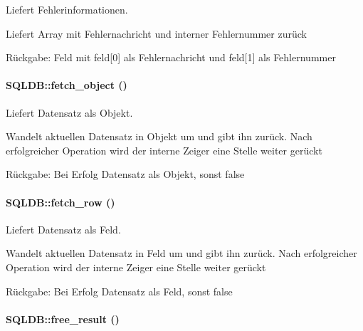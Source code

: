 Liefert Fehlerinformationen. 

Liefert Array mit Fehlernachricht und interner Fehlernummer zurück \begin{Desc}
\item[R\"{u}ckgabe:]Feld mit feld\mbox{[}0\mbox{]} als Fehlernachricht und feld\mbox{[}1\mbox{]} als Fehlernummer \end{Desc}
\hypertarget{classSQLDB_43fa0105050768eba0ded5bd2f736709}{
\paragraph[fetch\_\-object]{\setlength{\rightskip}{0pt plus 5cm}SQLDB::fetch\_\-object ()}\hfill}
\label{classSQLDB_43fa0105050768eba0ded5bd2f736709}


Liefert Datensatz als Objekt. 

Wandelt aktuellen Datensatz in Objekt um und gibt ihn zurück. Nach erfolgreicher Operation wird der interne Zeiger eine Stelle weiter gerückt \begin{Desc}
\item[R\"{u}ckgabe:]Bei Erfolg Datensatz als Objekt, sonst false \end{Desc}
\hypertarget{classSQLDB_cbd6f7a7ad0dbe4cd7f0533649be1abd}{
\paragraph[fetch\_\-row]{\setlength{\rightskip}{0pt plus 5cm}SQLDB::fetch\_\-row ()}\hfill}
\label{classSQLDB_cbd6f7a7ad0dbe4cd7f0533649be1abd}


Liefert Datensatz als Feld. 

Wandelt aktuellen Datensatz in Feld um und gibt ihn zurück. Nach erfolgreicher Operation wird der interne Zeiger eine Stelle weiter gerückt \begin{Desc}
\item[R\"{u}ckgabe:]Bei Erfolg Datensatz als Feld, sonst false \end{Desc}
\hypertarget{classSQLDB_8168b4df39a17186620e4777c7413a44}{
\paragraph[free\_\-result]{\setlength{\rightskip}{0pt plus 5cm}SQLDB::free\_\-result ()}\hfill}
\label{classSQLDB_8168b4df39a17186620e4777c7413a44}


